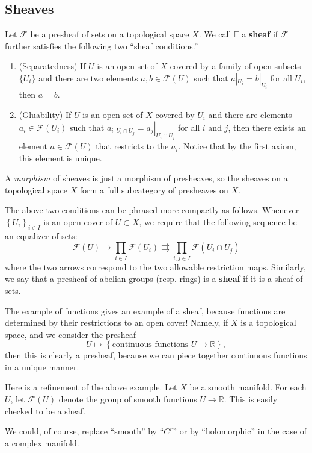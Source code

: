\subsection{Sheaves}

\begin{definition} Let $\mathcal{F}$ be a presheaf of sets
 on a topological space $X$. We call $\mathbb{F}$ a
\textbf{sheaf} if $\mathcal{F}$ further satisfies the following two
``sheaf conditions.''
\begin{enumerate}
\item(Separatedness) {If $U$ is an open set of $X$ covered by a family of open subsets $\{U_i\}$ and there
are two elements $a,b\in \mathcal{F}(U)$ such that
$a|_{U_i}=b|_{U_i}$ for all $U_i$, then $a=b$.}
\item(Gluability) {If $U$ is an open set of $X$ covered by $U_i$ and there
are elements $a_i\in \mathcal{F}(U_i)$ such that $a_i|_{U_i\cap
U_j} = a_j|_{U_i\cap U_j}$ for all $i$ and $j$, then there
exists an element $a\in\mathcal{F}(U)$ that restricts to the
$a_i$. Notice that by the first axiom, this element is unique.}
\end{enumerate}
A \emph{morphism} of sheaves is just a morphism of presheaves, so the sheaves
on a topological space $X$ form a
full subcategory of presheaves on $X$.
\end{definition}

The above two conditions can be phrased more compactly as follows. Whenever
$\left\{U_i\right\}_{i \in I}$ is an open cover of $U \subset X$, we require that the
following sequence be an equalizer of sets:
\[  \mathcal{F}(U) \to \prod_{i \in I} \mathcal{F}(U_i) \rightrightarrows \prod_{i,j \in I}
\mathcal{F}(U_i \cap U_j) \]
where the two arrows correspond to the two allowable restriction maps.
Similarly, we say that a presheaf of abelian groups (resp. rings) is a
\textbf{sheaf} if it is a sheaf of sets.

\begin{example} 
The example of functions gives an example of a sheaf, because functions are
determined by their restrictions to an open cover! Namely, if $X$ is a
topological space, and we consider the presheaf
\[ U \mapsto \left\{\text{continuous functions } U \to \mathbb{R}\right\} , \]
then this is clearly a presheaf, because we can piece together continuous
functions in a unique manner.
\end{example} 

\begin{example} 
Here is a refinement of the above example. Let $X$ be a smooth manifold.
For each $U$, let $\mathcal{F} (U)$ denote the group of smooth functions $U
\to \mathbb{R}$. This is easily checked to be a sheaf.

We could, of course, replace ``smooth'' by ``$C^r$'' or by ``holomorphic'' in
the case of a complex manifold.
\end{example} 


